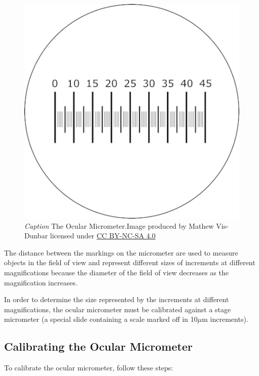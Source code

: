 \documentclass[
]{book}
\begin{document}
\begin{figure}
\centering
\includegraphics{images/DM_ocular-micrometer.png}
\caption{\emph{Caption} The Ocular Micrometer.Image produced by Mathew Vis-Dunbar licensed under \href{https://creativecommons.org/licenses/by-nc-sa/4.0/}{CC BY-NC-SA 4.0}}
\end{figure}

The distance between the markings on the micrometer are used to measure objects in the field of view and represent different sizes of increments at different magnifications because the diameter of the field of view decreases as the magnification increases.

In order to determine the size represented by the increments at different magnifications, the ocular micrometer must be calibrated against a stage micrometer (a special slide containing a scale marked off in 10\(\mu\)m increments).

\hypertarget{calibrating-the-ocular-micrometer}{%
\subsection*{Calibrating the Ocular Micrometer}\label{calibrating-the-ocular-micrometer}}

To calibrate the ocular micrometer, follow these steps:
\end{document}
